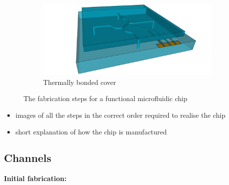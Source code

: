\documentclass[draft]{jyflluk}
\begin{document}
\begin{figure}
    \vspace{1cm}
    \begin{subfigure}[t]{\textwidth}
    \centering
        \includegraphics[width=\linewidth]{steps/11.Finished.png} 
        \caption{Thermally bonded cover} \label{fig:process11}
    \end{subfigure}
    \caption{The fabrication steps for a functional microfluidic chip} \label{fig:processFULL}
\end{figure}






\begin{itemize}
    \item images of all the steps in the correct order required to realise the chip
    \item short explanation of how the chip is manufactured
\end{itemize}







































\subsection{Channels}
\label{sec:xxx3}

\textbf{Initial fabrication:}
\end{document}

